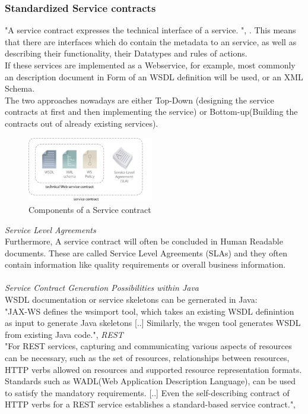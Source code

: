\documentclass[12pt]{article}
\begin{document}
\subsubsection{Standardized Service contracts}
\label{sec:StandardizedServicecontracts}
"A service contract expresses the technical interface of a service. ", \cite[page 33]{grau}. This means that there are interfaces which do contain the metadata to an service, as well as describing their functionality, their Datatypes and rules of actions. \cite[page 86]{te} \\ If these services are implemented as a Webservice, for example, most commonly an description document in Form of an WSDL definition will be used, or an XML Schema. \\
The two approaches nowadays are either Top-Down (designing the service contracts at first and then implementing the service) or Bottom-up(Building the contracts out of already existing services). \cite[page 151,152]{grau}
\begin{figure}[here!]
	\centering
	\includegraphics[width=0.49\textwidth]{images/soajuhu}
	\caption{Components of a Service contract \cite{photos}}
	\label{fig:servicecontractcomponents}
	\end{figure}
\FloatBarrier
 \noindent\textit{Service Level Agreements} \\
Furthermore, A service contract will often be concluded in Human Readable documents. These are called Service Level Agreements (SLAs) and they often contain information like quality requirements or overall business information. 
\\ \\
\textit{Service Contract Generation Possibilities within Java} \\
WSDL documentation or service skeletons can be gernerated in Java:\\ 
"JAX-WS defines the wsimport tool, which takes an existing WSDL definintion as input to generate Java skeletons [..] Similarly, the wsgen tool generates WSDL from existing Java code.",\cite[page 151]{grau}
 \noindent\textit{REST}\\
"For REST services, capturing and communicating various aspects of resources can be necessary, such as the set of resources, relationships between resources, HTTP verbs allowed on resources and supported resource representation formats. Standards such as WADL(Web Application Description Language), can be used to satisfy the mandatory requirements. [..] Even the self-describing contract of HTTP verbs for a REST service establishes a standard-based service contract.", \cite[page 151]{grau}
\end{document}
